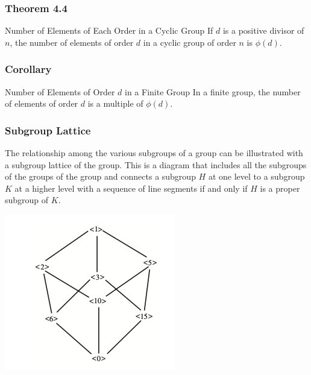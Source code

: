 \documentclass{beamer}
\begin{document}
\begin{frame}
    \frametitle{Theorem 4.4}

    \begin{block}{Number of Elements of Each Order in a Cyclic Group}
        If \(d\) is a positive divisor of \(n\), the number of elements of order \(d\) in a cyclic group of order \(n\) is \(\phi(d)\).         
    \end{block}\pause

\end{frame}

\begin{frame}
    \frametitle{Corollary}

    \begin{block}{Number of Elements of Order \(d\) in a Finite Group}  
        In a finite group, the number of elements of order \(d\) is a multiple of \(\phi(d)\). 
    \end{block}

\end{frame}

\begin{frame}
    \frametitle{Subgroup Lattice }

    The  relationship among the various subgroups of a group can be illustrated with a subgroup lattice of the group. This is a diagram that includes all the subgroups of the groups of the group and connects a subgroup \(H\) at one level to a subgroup \(K\) at a higher level with a sequence of line segments if and only if \(H\) is a proper subgroup of \(K\). 

    \includegraphics[scale=0.5]{Figures/fig_1.png}

\end{frame}
\end{document}
